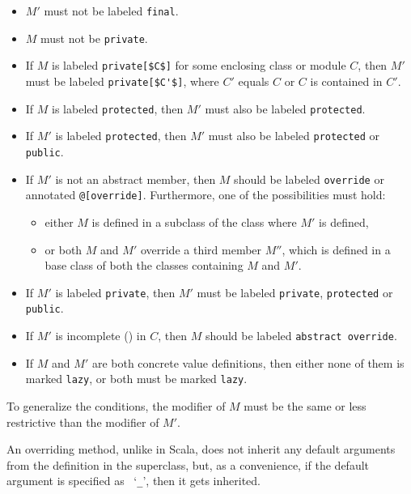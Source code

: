 \begin{itemize}
\item 
$M'$ must not be labeled \lstinline!final!. 

\item 
$M$ must not be \lstinline!private!. 

\item 
If $M$ is labeled \lstinline!private[$C$]! for some enclosing class or module $C$, then $M'$ must be labeled \lstinline!private[$C'$]!, where $C'$ equals $C$ or $C$ is contained in $C'$.

\item 
If $M$ is labeled \lstinline!protected!, then $M'$ must also be labeled \lstinline!protected!. 

\item 
If $M'$ is labeled \lstinline!protected!, then $M'$ must also be labeled \lstinline!protected! or \lstinline!public!. 

\item
If $M'$ is not an abstract member, then $M$ should be labeled \lstinline!override! or annotated \lstinline!@[override]!. Furthermore, one of the possibilities must hold:
\begin{itemize}
\item either $M$ is defined in a subclass of the class where $M'$ is defined,
\item or both $M$ and $M'$ override a third member $M''$, which is defined in a base class of both the classes containing $M$ and $M'$.
\end{itemize}

\item 
If $M'$ is labeled \lstinline!private!, then $M'$ must be labeled \lstinline!private!, \lstinline!protected! or \lstinline!public!. 

\item
If $M'$ is incomplete () in $C$, then $M$ should be labeled \lstinline!abstract override!. 

\item
If $M$ and $M'$ are both concrete value definitions, then either none of them is marked \lstinline!lazy!, or both must be marked \lstinline!lazy!. 
\end{itemize}

To generalize the conditions, the modifier of $M$ must be the same or less restrictive than the modifier of $M'$. 

An overriding method, unlike in Scala, does not inherit any default arguments from the definition in the superclass, but, as a convenience, if the default argument is specified as ~`\lstinline!_!', then it gets inherited. 





